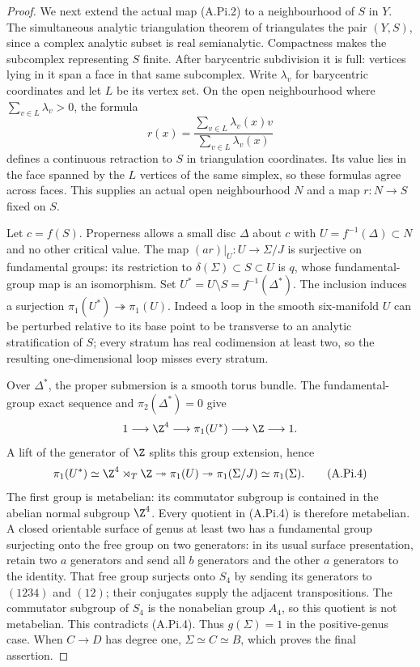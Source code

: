 \begin{proof}
We next extend the actual map (A.Pi.2) to a neighbourhood
of $S$ in $Y$. The simultaneous analytic triangulation
theorem of \cite[\S3, Theorem~2, p.~464]{Lojasiewicz1964}
triangulates the pair $(Y,S)$, since a complex analytic
subset is real semianalytic. Compactness makes the
subcomplex representing $S$ finite. After barycentric
subdivision it is full: vertices lying in it span a
face in that same subcomplex. Write $\lambda_v$ for
barycentric coordinates and let $L$ be its vertex set.
On the open neighbourhood where $\sum_{v\in L}\lambda_v>0$,
the formula
\[
 r(x)=\frac{\sum_{v\in L}\lambda_v(x)v}
                  {\sum_{v\in L}\lambda_v(x)}       \tag{A.Pi.3}
\]
defines a continuous retraction to $S$ in triangulation
coordinates. Its value lies in the face spanned by the
$L$ vertices of the same simplex, so these formulas
agree across faces. This supplies an actual open
neighbourhood $N$ and a map $r:N\to S$ fixed on $S$.

Let $c=f(S)$. Properness allows a small disc $\Delta$
about $c$ with $U=f^{-1}(\Delta)\subset N$ and no other
critical value. The map $(ar)|_U:U\to\Sigma/J$ is
surjective on fundamental groups: its restriction to
$\delta(\Sigma)\subset S\subset U$ is $q$, whose
fundamental-group map is an isomorphism.
Set $U^*=U\setminus S=f^{-1}(\Delta^*)$.
The inclusion induces a surjection
$\pi_1(U^*)\twoheadrightarrow\pi_1(U)$.
Indeed a loop in the smooth six-manifold $U$ can be
perturbed relative to its base point to be transverse
to an analytic stratification of $S$; every stratum
has real codimension at least two, so the resulting
one-dimensional loop misses every stratum.

Over $\Delta^*$, the proper submersion is a smooth
torus bundle. The fundamental-group exact sequence
and $\pi_2(\Delta^*)=0$ give
\[
 1\longrightarrow\Z^4\longrightarrow\pi_1(U^*)
       \longrightarrow\Z\longrightarrow1.
\]
A lift of the generator of $\Z$ splits this group
extension, hence
\[
 \pi_1(U^*)\simeq\Z^4\rtimes_T\Z
 \twoheadrightarrow\pi_1(U)
 \twoheadrightarrow\pi_1(\Sigma/J)
 \simeq\pi_1(\Sigma).                             \tag{A.Pi.4}
\]
The first group is metabelian: its commutator subgroup
is contained in the abelian normal subgroup $\Z^4$.
Every quotient in (A.Pi.4) is therefore metabelian.
A closed orientable surface of genus at least two
has a fundamental group surjecting onto the free
group on two generators: in its usual surface
presentation, retain two $a$ generators and send all
$b$ generators and the other $a$ generators to the
identity. That free group surjects onto $S_4$ by
sending its generators to $(1234)$ and $(12)$;
their conjugates supply the adjacent transpositions.
The commutator subgroup of $S_4$ is the nonabelian
group $A_4$, so this quotient is not metabelian.
This contradicts (A.Pi.4). Thus $g(\Sigma)=1$ in the
positive-genus case. When $C\to D$ has degree one,
$\Sigma\simeq C\simeq B$, which proves the final
assertion.
\end{proof}

